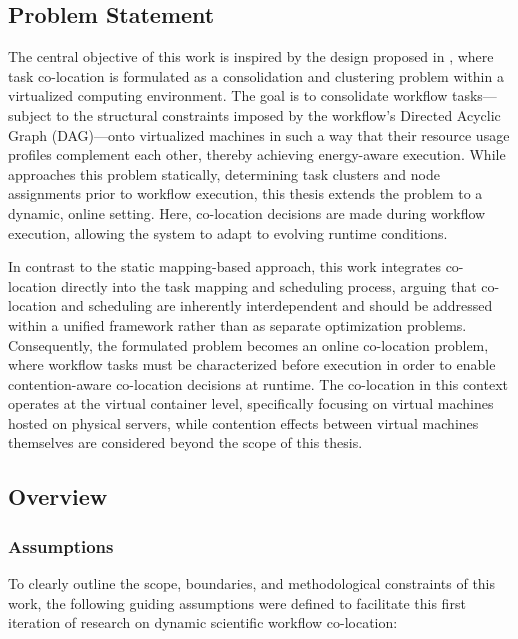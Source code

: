 \subsection{Problem Statement}
\label{sec:problem_statement}
The central objective of this work is inspired by the design proposed in \cite{5644899}, where task co-location is formulated as a consolidation and clustering problem within a virtualized computing environment. The goal is to consolidate workflow tasks—subject to the structural constraints imposed by the workflow’s Directed Acyclic Graph (DAG)—onto virtualized machines in such a way that their resource usage profiles complement each other, thereby achieving energy-aware execution. While \cite{5644899} approaches this problem statically, determining task clusters and node assignments prior to workflow execution, this thesis extends the problem to a dynamic, online setting. Here, co-location decisions are made during workflow execution, allowing the system to adapt to evolving runtime conditions.

In contrast to the static mapping-based approach, this work integrates co-location directly into the task mapping and scheduling process, arguing that co-location and scheduling are inherently interdependent and should be addressed within a unified framework rather than as separate optimization problems. Consequently, the formulated problem becomes an online co-location problem, where workflow tasks must be characterized before execution in order to enable contention-aware co-location decisions at runtime. The co-location in this context operates at the virtual container level, specifically focusing on virtual machines hosted on physical servers, while contention effects between virtual machines themselves are considered beyond the scope of this thesis.

\subsection{Overview}
\label{sec:overview}
\subsubsection{Assumptions}
\label{sec:assumptions}
To clearly outline the scope, boundaries, and methodological constraints of this work, the following guiding assumptions were defined to facilitate this first iteration of research on dynamic scientific workflow co-location:

